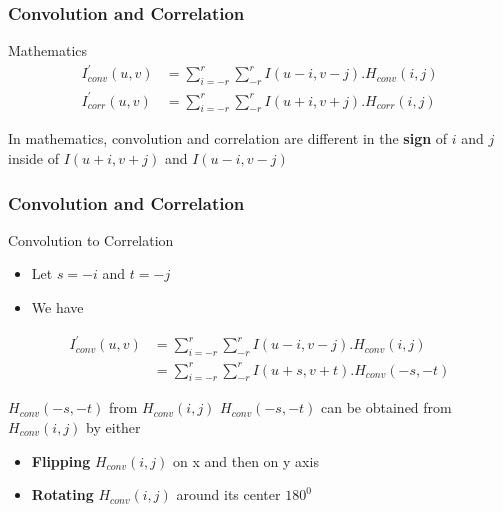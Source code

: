 \documentclass[english,11pt,table,handout]{beamer}
\begin{document}
\frame
{
	\frametitle{Convolution and Correlation}
	
	\begin{block}{Mathematics}
		\begin{equation*} 
		\begin{split}
		I_{conv}^{'}{(u,v)} &= \sum_{i=-r}^{r}{\sum_{-r}^{r}{I(u-i, v-j).H_{conv}{(i,j)}}} \\
		I_{corr}^{'}{(u,v)} &= \sum_{i=-r}^{r}{\sum_{-r}^{r}{I(u+i, v+j).H_{corr}{(i,j)}}}
		\end{split}
		\end{equation*}
	\end{block}
	In mathematics, convolution and correlation are different in the \textbf{sign} of $i$ and $j$ inside of $I(u+i, v+j)$ and $I(u-i, v-j)$
}
\frame
{
	\frametitle{Convolution and Correlation}
	
	\begin{block}{Convolution to Correlation}
		\begin{itemize}
			\item Let $s=-i$ and $t=-j$ 
			\item We have
		\end{itemize}
		\begin{equation*} 
		\begin{split}
		I_{conv}^{'}{(u,v)} &= \sum_{i=-r}^{r}{\sum_{-r}^{r}{I(u-i, v-j).H_{conv}{(i,j)}}} \\
				&= \sum_{i=-r}^{r}{\sum_{-r}^{r}{I(u+s, v+t).H_{conv}{(-s,-t)}}} 
		\end{split}
		\end{equation*}
	\end{block}
	\begin{alertblock}{$H_{conv}{(-s,-t)}$ from $H_{conv}{(i,j)}$}
		$H_{conv}{(-s,-t)}$ can be obtained from $H_{conv}{(i,j)}$ by either
			\begin{itemize}
				\item \textbf{Flipping} $H_{conv}{(i,j)}$ on x and then on y axis
				\item \textbf{Rotating} $H_{conv}{(i,j)}$ around its center $180^0$
			\end{itemize}
	\end{alertblock}
	
}
\frame
\end{document}
